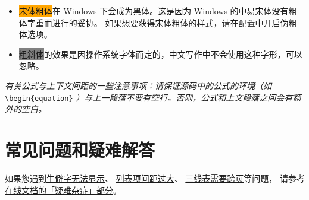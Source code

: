 \begin{itemize}[nosep]
  \item \colorbox{orange}{宋体粗体}在 Windows 下会成为黑体。这是因为 Windows 的中易宋体没有粗体字重而进行的妥协。
    如果想要获得宋体粗体的样式，请在配置中开启伪粗体选项。
  \item \colorbox{gray}{粗斜体}的效果是因操作系统字体而定的，中文写作中不会使用这种字形，可以忽略。
\end{itemize}

\textit{有关公式与上下文间距的一些注意事项：请保证源码中的公式的环境（如}
\\ \verb|\begin{equation}|
  \textit{）与上一段落不要有空行。否则，公式和上文段落之间会有额外的空白。}


\section{常见问题和疑难解答}

如果您遇到\href{https://bithesis.bitnp.net/faq/char-missing.html}{生僻字无法显示}、
\href{https://bithesis.bitnp.net/faq/enumitem-nosep.html}{列表项间距过大}、
\href{https://bithesis.bitnp.net/faq/longtable.html}{三线表需要跨页}等问题，
请参考\textcolor{magenta}{\href{https://bithesis.bitnp.net/faq/}{在线文档的「疑难杂症」部分}}。
